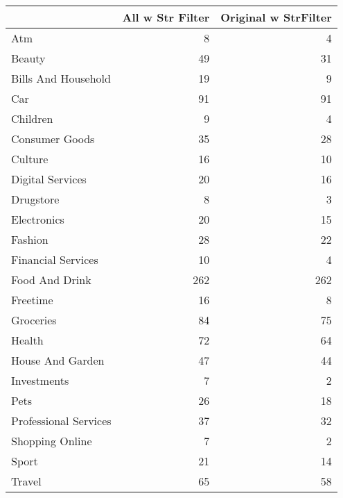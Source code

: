 \begin{tabular}{lrr}
\toprule
{} &  All w Str Filter &  Original w StrFilter \\
\midrule
Atm                   &                 8 &                     4 \\
Beauty                &                49 &                    31 \\
Bills And Household   &                19 &                     9 \\
Car                   &                91 &                    91 \\
Children              &                 9 &                     4 \\
Consumer Goods        &                35 &                    28 \\
Culture               &                16 &                    10 \\
Digital Services      &                20 &                    16 \\
Drugstore             &                 8 &                     3 \\
Electronics           &                20 &                    15 \\
Fashion               &                28 &                    22 \\
Financial Services    &                10 &                     4 \\
Food And Drink        &               262 &                   262 \\
Freetime              &                16 &                     8 \\
Groceries             &                84 &                    75 \\
Health                &                72 &                    64 \\
House And Garden      &                47 &                    44 \\
Investments           &                 7 &                     2 \\
Pets                  &                26 &                    18 \\
Professional Services &                37 &                    32 \\
Shopping Online       &                 7 &                     2 \\
Sport                 &                21 &                    14 \\
Travel                &                65 &                    58 \\
\bottomrule
\end{tabular}
